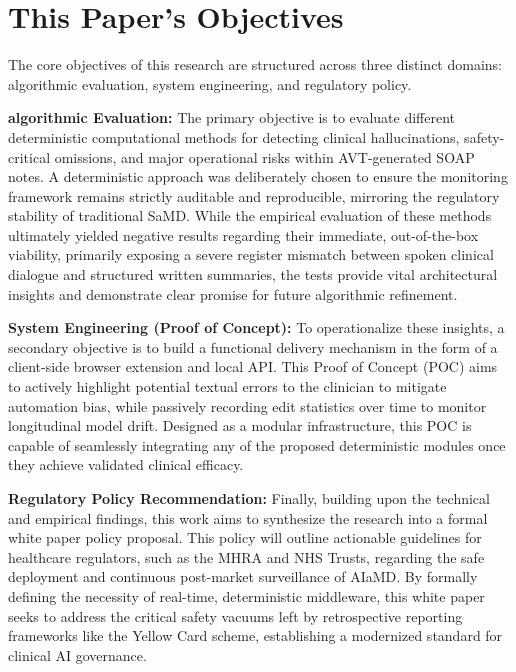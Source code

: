 \documentclass[11pt,a4paper]{article}
\begin{document}
\section{This Paper's Objectives}
\label{sec:This Paper's Objectives}

The core objectives of this research are structured across three distinct domains: algorithmic evaluation, system engineering, and regulatory policy.

 \textbf{algorithmic Evaluation:} The primary objective is to evaluate different deterministic computational methods for detecting clinical hallucinations, safety-critical omissions, and major operational risks within AVT-generated SOAP notes. A deterministic approach was deliberately chosen to ensure the monitoring framework remains strictly auditable and reproducible, mirroring the regulatory stability of traditional SaMD. While the empirical evaluation of these methods ultimately yielded negative results regarding their immediate, out-of-the-box viability, primarily exposing a severe register mismatch between spoken clinical dialogue and structured written summaries, the tests provide vital architectural insights and demonstrate clear promise for future algorithmic refinement. 
 
\textbf{System Engineering (Proof of Concept):} To operationalize these insights, a secondary objective is to build a functional delivery mechanism in the form of a client-side browser extension and local API. This Proof of Concept (POC) aims to actively highlight potential textual errors to the clinician to mitigate automation bias, while passively recording edit statistics over time to monitor longitudinal model drift. Designed as a modular infrastructure, this POC is capable of seamlessly integrating any of the proposed deterministic modules once they achieve validated clinical efficacy. 

\textbf{Regulatory Policy Recommendation:} Finally, building upon the technical and empirical findings, this work aims to synthesize the research into a formal white paper policy proposal. This policy will outline actionable guidelines for healthcare regulators, such as the MHRA and NHS Trusts, regarding the safe deployment and continuous post-market surveillance of AIaMD. By formally defining the necessity of real-time, deterministic middleware, this white paper seeks to address the critical safety vacuums left by retrospective reporting frameworks like the Yellow Card scheme, establishing a modernized standard for clinical AI governance.
\end{document}
